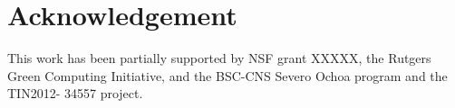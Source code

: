 \section*{Acknowledgement}
\label{sec:acks}

This work has been partially supported by NSF grant XXXXX, the Rutgers Green Computing Initiative, and
the BSC-CNS Severo Ochoa program and the TIN2012- 34557 project.